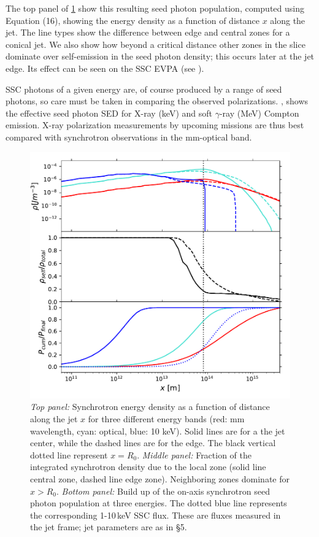 The top panel of \cref{fig:ssc7} show this resulting seed photon population, computed using Equation (16), showing the energy density as a function of distance $x$ along the jet. The line types show the difference between edge and central zones for a conical jet. We also show how beyond a critical distance other zones in the slice dominate over self-emission in the seed photon density; this occurs later at the jet edge. Its effect can be seen on the SSC EVPA (see ). 

SSC photons of a given energy are, of course produced by a range of seed photons, so care must be taken in comparing the observed polarizations. , shows the effective seed photon SED for X-ray (keV) and soft $\gamma$-ray (MeV) Compton emission. X-ray polarization measurements by upcoming missions are thus best compared with synchrotron observations in the mm-optical band.

\begin{figure}[t]
\includegraphics[width=0.65\linewidth]{figures/Figure7.pdf}
\centering
\caption{\textit{Top panel:} Synchrotron energy density as a function of distance along the jet $x$ for three different energy bands (red: mm wavelength, cyan: optical, blue: 10 keV). Solid lines are for a the jet center, while the dashed lines are for the edge. The black vertical dotted line represent $x=R_0$. \textit{Middle panel:} Fraction of the integrated synchrotron density
due to the local zone (solid line central zone, dashed line edge zone). Neighboring zones dominate for $x > R_0$. \textit{Bottom panel:} Build up of the on-axis synchrotron seed photon population at three energies. The dotted blue line represents the corresponding 1-10\,keV SSC flux. %
These are fluxes measured in the jet frame; jet parameters are as in \S5.}
\label{fig:ssc7}
\end{figure}

